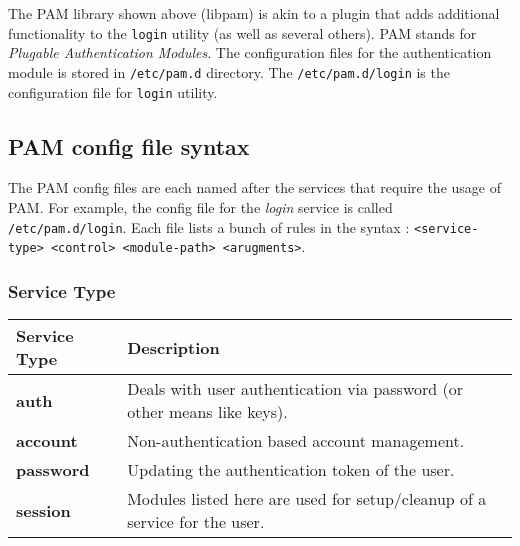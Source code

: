 \noindent
The PAM library shown above (libpam) is akin to a plugin that adds additional functionality to the \verb|login| utility (as well as several others). PAM stands for \textit{Plugable Authentication Modules}. The configuration files for the authentication module is stored in \verb|/etc/pam.d| directory. The \verb|/etc/pam.d/login| is the configuration file for \verb|login| utility. 

\subsection{PAM config file syntax}
The PAM config files are each named after the services that require the usage of PAM. For example, the config file for the \textit{login} service is called \verb|/etc/pam.d/login|. Each file lists a bunch of rules in the syntax : \verb|<service-type> <control> <module-path> <arugments>|.

\subsubsection{Service Type}
\vspace{-10pt}
\begin{tabular}{ll}
	\toprule
	\textbf{Service Type} &\textbf{Description} \\
	\midrule
	\textbf{auth} &Deals with user authentication via password (or other means like keys). \\	
	\textbf{account} &Non-authentication based account management. \\	
	\textbf{password} &Updating the authentication token of the user. \\
	\textbf{session} &Modules listed here are used for setup/cleanup of a service for the user. \\
	\bottomrule
\end{tabular}


